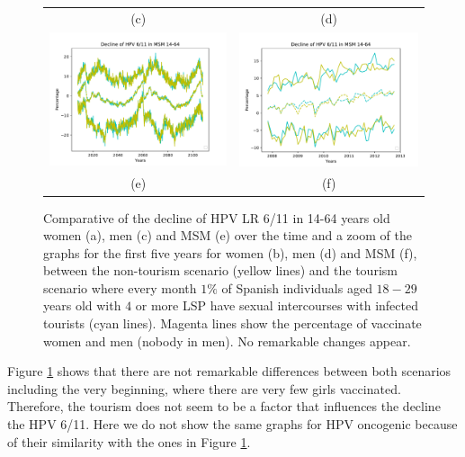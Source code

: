 \begin{figure}[!]
\begin{tabular}{cc}
		(c)	& (d) \\ 		
		\includegraphics[width=0.5\linewidth]{IMGs/8.-Turismo/verr_MSM.pdf}	& 
		\includegraphics[width=0.5\linewidth]{IMGs/8.-Turismo/verr_MSM_ZOOM.pdf}  \\ 
		(e)	& (f)
 	\end{tabular} 
	\caption{Comparative of the decline of  HPV LR 6/11 in 14-64 years old women (a), men (c) and MSM (e) over the time and a zoom of the graphs for the first five years for women (b), men (d) and MSM (f), between the non-tourism scenario (yellow lines) and the tourism scenario where every month $1\%$ of Spanish individuals aged $18-29$ years old with $4$ or more LSP have sexual intercourses with infected tourists (cyan lines). Magenta lines show the percentage of vaccinate women and men (nobody in men). No remarkable changes appear.}
	\label{fig:turismo}
\end{figure}

Figure \ref{fig:turismo} shows that there are not remarkable differences between both scenarios including the very beginning, where there are very few girls vaccinated. Therefore, the tourism does not seem to be a factor that influences the decline the HPV 6/11. Here we do not show the same graphs for HPV oncogenic because of their similarity with the ones in Figure \ref{fig:turismo}. 
